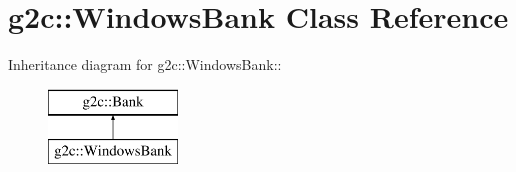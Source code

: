\hypertarget{classg2c_1_1_windows_bank}{
\section{g2c::WindowsBank Class Reference}
\label{classg2c_1_1_windows_bank}
}
Inheritance diagram for g2c::WindowsBank::\begin{figure}[H]
\begin{center}
\leavevmode
\includegraphics[height=2cm]{classg2c_1_1_windows_bank}
\end{center}
\end{figure}
